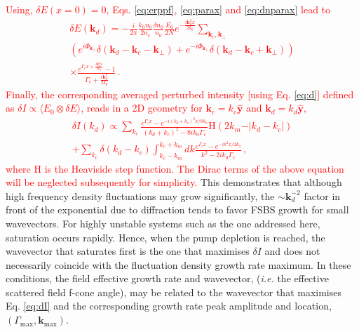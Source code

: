 \documentclass[
 reprint,
 superscriptaddress,
 amsmath,amssymb,
 aps,
]{revtex4-1}
\def\tc{\textcolor{red}}
\begin{document}
\tc{
Using, $\delta E(x=0)=0$, Eqs. \eqref{eq:erppf}, \eqref{eq:parax} and \eqref{eq:dnparax} lead to
\begin{align}
 \delta E(\mathbf{k}_d)=-\frac{i}{2\pi}\frac{k_0n_0}{2n_c} \frac{\delta n_0}{n_0}\frac{E_0}{2N} e^{-\frac{i\mathbf{k}_d^2 x}{2k_0}}   \sum_{\mathbf{k}_c,\mathbf{k}_\perp}\nonumber \\ 
 \left( 
 e^{i\Phi_{\mathbf{k}_\perp}}\delta( \mathbf{k}_d -\mathbf{k}_c-\mathbf{k}_\perp)
 +e^{-i\Phi_{\mathbf{k}_\perp}}\delta( \mathbf{k}_d -\mathbf{k}_c+\mathbf{k}_\perp)
 \right)\nonumber \\ 
 \times \frac{e^{\Gamma_cx+\frac{i\mathbf{k}_d^2 x}{2k_0} }-1}{\Gamma_c+\frac{i\mathbf{k}_d^2 }{2k_0}}  \, .
\end{align}
Finally, the corresponding averaged perturbed intensity [using Eq. \eqref{eq:d}] defined as 
$ \delta I \propto\langle  E_0 \otimes \delta E\rangle$, %
reads in a 2D geometry for $ \mathbf{k}_c=k_c \hat{\mathbf{y}}$ and $\mathbf{k}_d=k_d\hat{\mathbf{y}}$,
\begin{align}
\delta I (k_d)\propto \sum_{k_c} \frac{e^{\Gamma_c x} -e^{-i( k_d +k_c)^2x/8k_0} }{ ( k_d +k_c)^2 - 8ik_0\Gamma_c  } \mathrm{H}(2k_m - \vert  k_d-k_c \vert)  \nonumber\\
+ \sum_{k_c}\delta(k_d-k_c)\int_{k_c-k_m}^{k_c+k_m} dk \frac{e^{\Gamma_c x} -e^{-ik^2x/2k_0} }{k^2 - 2ik_0\Gamma_c  }\, ,\label{eq:dI}
\end{align}
where $\mathrm{H}$ is the Heaviside step function.
The Dirac terms of the above equation will be neglected subsequently for simplicity. 
} 
This demonstrates that although high frequency density fluctuations may grow significantly, the $\sim \mathbf{k}_d^{-2}$ factor in front of the exponential due to diffraction tends to favor FSBS growth for small wavevectors. 
For highly unstable systems such as the one addressed here, saturation occurs rapidly.
Hence, when the pump depletion is reached, the wavevector that saturates first is the one that maximises $\delta I$ and does not necessarily coincide with the fluctuation density growth rate maximum. 
In these conditions, the field effective growth rate and wavevector, (\emph{i.e.}
the effective scattered field f-cone angle), may be related to the wavevector that maximises Eq. \eqref{eq:dI} and the corresponding growth rate peak amplitude and location, $(\Gamma_\mathrm{max},\mathbf{k}_\mathrm{max})$.
\end{document}
